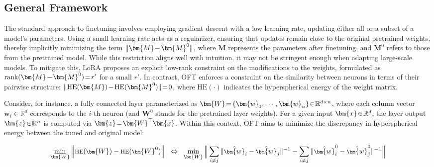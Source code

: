 \subsection{General Framework}

The standard approach to finetuning involves employing gradient descent with a low learning rate, updating either all or a subset of a model's parameters. Using a small learning rate acts as a regularizer, ensuring that updates remain close to the original pretrained weights, thereby implicitly minimizing the term $\thickmuskip=2mu \medmuskip=2mu \| \bm{M} - \bm{M}^0\|$, where $\bm{M}$ represents the parameters after finetuning, and $\bm{M}^0$ refers to those from the pretrained model. While this restriction aligns well with intuition, it may not be stringent enough when adapting large-scale models. To mitigate this, LoRA proposes an explicit low-rank constraint on the modifications to the weights, formulated as $\thickmuskip=2mu \medmuskip=2mu \text{rank}(\bm{M} - \bm{M}^0)=r'$ for a small $r'$. In contrast, OFT enforces a constraint on the similarity between neurons in terms of their pairwise structure: $\thickmuskip=2mu \medmuskip=2mu \| \text{HE}(\bm{M})-\text{HE}(\bm{M}^0) \|=0$, where $\text{HE}(\cdot)$ indicates the hyperspherical energy of the weight matrix. 

Consider, for instance, a fully connected layer parameterized as $\thickmuskip=2mu \medmuskip=2mu \bm{W}=\{\bm{w}_1,\cdots,\bm{w}_n\}\in\mathbb{R}^{d\times n}$, where each column vector $\bm{w}_i\in\mathbb{R}^{d}$ corresponds to the $i$-th neuron (and $\bm{W}^0$ stands for the pretrained layer weights). For a given input $\thickmuskip=2mu \medmuskip=2mu \bm{x}\in\mathbb{R}^d$, the layer output $\thickmuskip=2mu \medmuskip=2mu \bm{z}\in\mathbb{R}^n$ is computed via $\thickmuskip=2mu \medmuskip=2mu \bm{z}=\bm{W}^\top\bm{x}$. Within this context, OFT aims to minimize the discrepancy in hyperspherical energy between the tuned and original model:

\begin{equation}\label{eq:oft_principle}
\footnotesize
\min_{\bm{W}} \left\| \text{HE}(\bm{W})-\text{HE}(\bm{W}^0)\right\|~~\Leftrightarrow~~\min_{\bm{W}} \bigg{\|} \sum_{i\neq j} \|\hat{\bm{w}}_i-\hat{\bm{w}}_j\|^{-1}-\sum_{i\neq j} \|\hat{\bm{w}}^0_i-\hat{\bm{w}}^0_j\|^{-1}\bigg{\|}
\end{equation}

